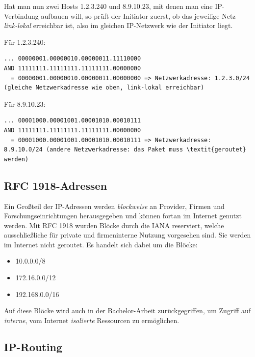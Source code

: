 Hat man nun zwei Hosts 1.2.3.240 und 8.9.10.23, mit denen man eine IP-Verbindung aufbauen will, so prüft der Initiator zuerst, ob das jeweilige Netz \textit{link-lokal} erreichbar ist, also im gleichen IP-Netzwerk wie der Initiator liegt.

Für 1.2.3.240:

\begin{lstlisting}[label=local-ip-address-AND-subnet-same,caption=Blun]
... 00000001.00000010.00000011.11110000
AND 11111111.11111111.11111111.00000000
  = 00000001.00000010.00000011.00000000 => Netzwerkadresse: 1.2.3.0/24 (gleiche Netzwerkadresse wie oben, link-lokal erreichbar)
\end{lstlisting}

Für 8.9.10.23:

\begin{lstlisting}[label=local-ip-address-AND-subnet-different,caption=Blub]
... 00001000.00001001.00001010.00010111
AND 11111111.11111111.11111111.00000000
  = 00001000.00001001.00001010.00010111 => Netzwerkadresse: 8.9.10.0/24 (andere Netzwerkadresse: das Paket muss \textit{geroutet} werden)
\end{lstlisting}

\subsection{RFC 1918-Adressen}
Ein Großteil der IP-Adressen werden \textit{blockweise} an Provider, Firmen und Forschungseinrichtungen herausgegeben und können fortan im Internet genutzt werden. Mit RFC 1918  wurden Blöcke durch die IANA reserviert, welche ausschließliche für private und firmeninterne Nutzung vorgesehen sind. Sie werden im Internet nicht geroutet. Es handelt sich dabei um die Blöcke:
\begin{itemize}
\item 10.0.0.0/8
\item 172.16.0.0/12
\item 192.168.0.0/16
\end{itemize}

Auf diese Blöcke wird auch in der Bachelor-Arbeit zurückgegriffen, um Zugriff auf \textit{interne}, vom Internet \textit{isolierte} Ressourcen zu ermöglichen.

\subsection{IP-Routing}

